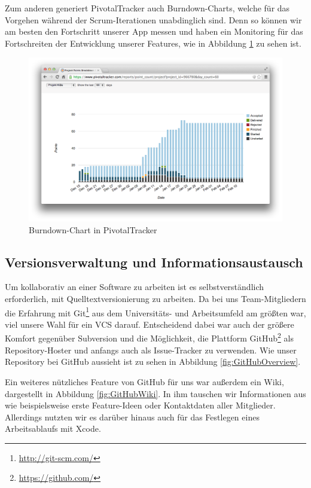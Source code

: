 \noindent	Zum anderen generiert PivotalTracker auch Burndown-Charts, welche für das Vorgehen während der Scrum-Iterationen unabdinglich sind. Denn so können wir am besten den Fortschritt unserer App messen und haben ein Monitoring für das Fortschreiten der Entwicklung unserer Features, wie in Abbildung \ref{fig:TrackerBurndown} zu sehen ist.

\begin{figure}[h]
	\centering
	\includegraphics[scale=.25]{Pictures/TrackerBurndown}
	\vspace{-.8cm}
	\caption{Burndown-Chart in PivotalTracker\label{fig:TrackerBurndown}}
\end{figure}

\subsection{Versionsverwaltung und Informationsaustausch}
	Um kollaborativ an einer Software zu arbeiten ist es selbstverständlich erforderlich, mit Quelltextversionierung zu arbeiten. Da bei uns Team-Mitgliedern die Erfahrung mit Git\footnote{\url{http://git-scm.com/}} aus dem Universitäts- und Arbeitsumfeld am größten war, viel unsere Wahl für ein \acs{VCS} darauf. Entscheidend dabei war auch der größere Komfort gegenüber Subversion und die Möglichkeit, die Plattform GitHub\footnote{\url{https://github.com/}} als Repository-Hoster und anfangs auch als Issue-Tracker zu verwenden. Wie unser Repository bei GitHub aussieht ist zu sehen in Abbildung \ref{fig:GitHubOverview}.
	
	Ein weiteres nützliches Feature von GitHub für uns war außerdem ein Wiki, dargestellt in Abbildung \ref{fig:GitHubWiki}. In ihm tauschen wir Informationen aus wie beispielsweise erste Feature-Ideen oder Kontaktdaten aller Mitglieder. Allerdings nutzten wir es darüber hinaus auch für das Festlegen eines Arbeitsablaufs mit Xcode.
	
